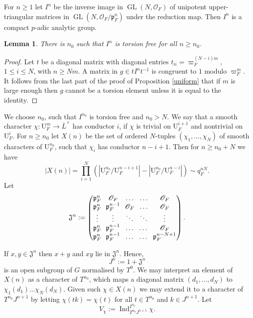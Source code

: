 \documentclass[JEP,XML,SOM,Unicode,NoEqCountersInSection]{cedram}
\let\mathcal\mathscr
\newtheorem{lem}[prop]{Lemma}
\theoremstyle{definition}
\DeclareMathOperator{\Ind}{Ind}
\DeclareMathOperator{\GL}{GL}
\newcommand{\Indu}[3]{\Ind_{#1}^{#2}{#3}}
\newcommand{\cO}{\mathcal{O}}
\newcommand{\pp}{\mathfrak p}
\newcommand{\pF}{\mathfrak{p}_F}
\newcommand{\UU}{\mathrm U}
\newcommand{\Lbar}{\overline{L}}
\begin{document}
For $n\ge 1$ let $I^n$ be the inverse image in $\GL(N, \cO_F)$ of unipotent upper-triangular matrices
in $\GL(N, \cO_{F}/\pp_F^n)$ under the reduction map. Then $I^n$ is a compact $p$-adic analytic group.

\begin{lem} There is $n_0$ such that $I^n$ is torsion free for all $n\ge n_0$.
\end{lem}

\begin{proof} Let $t$ be a diagonal matrix with diagonal entries $t_{ii}= \varpi_F^{(N-i) m}$, $1\le i\le N$, with $n\ge Nm $.
A matrix in $g\in t I^n t^{-1}$ is congruent to $1$ modulo $\varpi_F^m$. It follows from the last part
of the proof of Proposition \ref{uniform} that if $m$ is large enough then
$g$ cannot be a torsion element unless it is equal to the identity.
\end{proof}

We choose $n_0$, such that $I^{n_0}$ is torsion free and $n_0> N$. We say that a smooth character $\chi: \UU^{m}_F\to \Lbar^{\times}$ has conductor $i$, if $\chi$ is trivial on $\UU^{i+1}_F$ and nontrivial on $\UU^i_F$.
For $n\ge n_0$ let $X(n)$ be the set of ordered $N$-tuples $(\chi_1, \ldots, \chi_N)$ of smooth characters of $\UU^{n_0}_F$, such that $\chi_i$ has conductor $n-i+1$. Then for $n\ge n_0 +N$ we have
\begin{equation} \label{size_X_n}
|X(n)|= \prod_{i=1}^N (|\UU^{n_0}_F/\UU^{n-i+1}_F| -|\UU^{n_0}_F/\UU^{n-i}_F|)\sim q_F^{nN}.
\end{equation}
Let
\[\arraycolsep3.5pt
\mathfrak J^n:=\begin{pmatrix}\pF^n & \cO_F & \ldots & \ldots& \cO_F\\
\pF^n & \pF^{n-1}&\cO_F& \ldots & \cO_F\\
\vdots & \vdots &\ddots & \ddots & \vdots\\
\pF^n & \pF^{n-1} & \ldots &\dots & \cO_F \\
\pF^n & \pF^{n-1} & \ldots &\dots & \pF^{n-N+1}\end{pmatrix}.
\]

If $x, y\in \mathfrak J^n$ then $x+y$ and $xy$ lie in $\mathfrak J^n$. Hence,
\[
J^n:= 1 +\mathfrak J^n
\]
is an open subgroup of $G$ normalised by $T^0$. We may interpret an element of $X(n)$ as a character of $T^{n_0}$, which maps a
diagonal matrix $(d_1, \ldots, d_N)$ to $\chi_1(d_1)\ldots \chi_N(d_N)$. Given such $\chi\in X(n)$ we may extend it to a character of $T^{n_0} J^{n+1}$ by letting $\chi(tk)=\chi(t)$ for all $t\in T^{n_0}$
and $k\in J^{n+1}$. Let
\[
V_{\chi}:= \Indu{T^{n_0} J^{n+1}}{I^{n_0}}{\chi}.
\]
\end{document}
